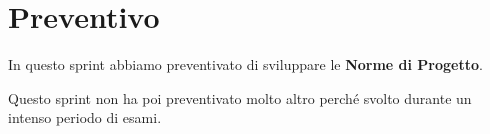 \section{Preventivo}\label{preventivo}

In questo sprint abbiamo preventivato di sviluppare le \textbf{Norme di Progetto}.

Questo sprint non ha poi preventivato molto altro perché svolto durante un intenso periodo di esami.
